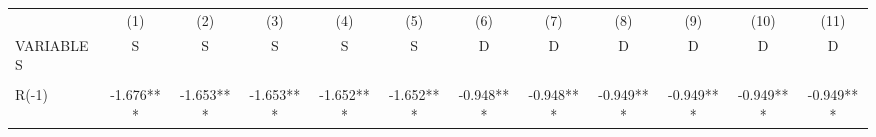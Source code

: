 \documentclass[]{article}
\begin{document}
\begin{center}
\begin{tabular}{lccccccccccc} \hline
 & (1) & (2) & (3) & (4) & (5) & (6) & (7) & (8) & (9) & (10) & (11) \\
VARIABLES & S & S & S & S & S & D & D & D & D & D & D \\ \hline
\vspace{4pt} & \begin{footnotesize}\end{footnotesize} & \begin{footnotesize}\end{footnotesize} & \begin{footnotesize}\end{footnotesize} & \begin{footnotesize}\end{footnotesize} & \begin{footnotesize}\end{footnotesize} & \begin{footnotesize}\end{footnotesize} & \begin{footnotesize}\end{footnotesize} & \begin{footnotesize}\end{footnotesize} & \begin{footnotesize}\end{footnotesize} & \begin{footnotesize}\end{footnotesize} & \begin{footnotesize}\end{footnotesize} \\
R(-1) & -1.676*** & -1.653*** & -1.653*** & -1.652*** & -1.652*** & -0.948*** & -0.948*** & -0.949*** & -0.949*** & -0.949*** & -0.949*** \\

\end{tabular}
\end{center}
\end{document}
